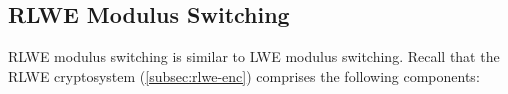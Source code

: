

\subsection{RLWE Modulus Switching}
\label{subsec:modulus-switch-rlwe}




RLWE modulus switching is similar to LWE modulus switching. Recall that the RLWE cryptosystem (\autoref{subsec:rlwe-enc}) comprises the following components:

